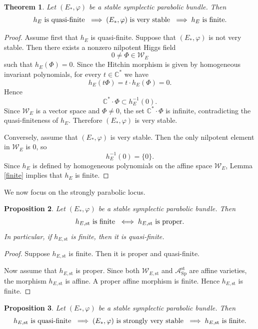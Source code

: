 \documentclass[11pt, reqno]{amsart}
\numberwithin{equation}{section}
\newcommand{\Sp}{\mathrm{Sp}}
\newtheorem{theorem}{Theorem}[section]
\newtheorem{prop}[theorem]{Proposition}
\theoremstyle{definition}
\begin{document}
\begin{theorem}\label{quasi-finite}
Let $(E_*,\varphi)$ be a stable symplectic parabolic bundle. Then
\[
h_E \textnormal{ is quasi-finite } \implies (E_*,\varphi) \textnormal{ is very stable } \implies h_E \textnormal{ is finite}.
\]
\end{theorem}
\begin{proof}
Assume first that $h_E$ is quasi-finite. Suppose that $(E_*,\varphi)$ is not very stable. Then there exists a nonzero nilpotent Higgs field
\[
0 \neq \Phi \in \mathcal{W}_E
\]
such that $h_E(\Phi)=0$. Since the Hitchin morphism is given by homogeneous invariant polynomials, for every $t \in \mathbb{C}^*$ we have
\[
h_E(t\Phi)=t\cdot h_E(\Phi)=0.
\]
Hence
\[
\mathbb{C}^* \cdot \Phi \subset h_E^{-1}(0).
\]
Since $\mathcal{W}_E$ is a vector space and $\Phi \neq 0$, the set $\mathbb{C}^*\cdot \Phi$ is infinite, contradicting the quasi-finiteness of $h_E$. Therefore $(E_*,\varphi)$ is very stable.

Conversely, assume that $(E_*,\varphi)$ is very stable. Then the only nilpotent element in $\mathcal{W}_E$ is $0$, so
\[
h_E^{-1}(0)=\{0\}.
\]
Since $h_E$ is defined by homogeneous polynomials on the affine space $\mathcal{W}_E$, Lemma \ref{finite} implies that $h_E$ is finite.
\end{proof}

We now focus on the strongly parabolic locus.

\begin{prop}\label{proper2}
Let $(E_*,\varphi)$ be a stable symplectic parabolic bundle. Then
\[
h_{E,\mathrm{st}} \textnormal{ is finite } \iff h_{E,\mathrm{st}} \textnormal{ is proper}.
\]
In particular, if $h_{E,\mathrm{st}}$ is finite, then it is quasi-finite.
\end{prop}

\begin{proof}
Suppose $h_{E,\mathrm{st}}$ is finite. Then it is proper and quasi-finite.

Now assume that $h_{E,\mathrm{st}}$ is proper. Since both $\mathcal{W}_{E,\mathrm{st}}$ and $\mathcal{A}^{\mathrm{st}}_{\Sp}$ are affine varieties, the morphism $h_{E,\mathrm{st}}$ is affine. A proper affine morphism is finite. Hence $h_{E,\mathrm{st}}$ is finite.
\end{proof}

\begin{prop}\label{stronglyverystable}
Let $(E_*,\varphi)$ be a stable symplectic parabolic bundle. Then
\[
h_{E,\mathrm{st}} \textnormal{ is quasi-finite } \implies (E_*,\varphi) \textnormal{ is strongly very stable } \implies h_{E,\mathrm{st}} \textnormal{ is finite}.
\]
\end{prop}
\end{document}
